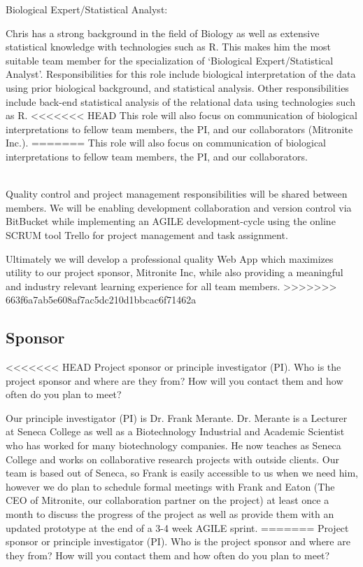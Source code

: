 \documentclass[10pt,twocolumn,letterpaper]{article}
\begin{document}
                Biological Expert/Statistical Analyst:
		
		Chris has a strong background in the field of Biology as well as extensive statistical knowledge with technologies such as R.
		This makes him the most suitable team member for the specialization of `Biological Expert/Statistical Analyst'.
		Responsibilities for this role include biological interpretation of the data using prior biological background, and statistical analysis.
		Other responsibilities include back-end statistical analysis of the relational data using technologies such as R.
<<<<<<< HEAD
		This role will also focus on communication of biological interpretations to fellow team members, the PI, and our collaborators (Mitronite Inc.).	
=======
		This role will also focus on communication of biological interpretations to fellow team members, the PI, and our collaborators.
		
		\\

            	Quality control and project management responsibilities will be shared between members.
		We will be enabling development collaboration and version control via BitBucket while implementing an
		AGILE development-cycle using the online SCRUM tool Trello for project management and task assignment.

            	Ultimately we will develop a professional quality Web App which maximizes utility to our project sponsor,
		Mitronite Inc, while also providing a meaningful and industry relevant learning experience for all team members.
>>>>>>> 663f6a7ab5e608af7ac5dc210d1bbcac6f71462a

        \subsection{Sponsor}

<<<<<<< HEAD
        Project sponsor or principle investigator (PI).
	Who is the project sponsor and where are they from? 
	How will you contact them and how often do you plan to meet?

	Our principle investigator (PI) is Dr. Frank Merante. 
	Dr. Merante is a Lecturer at Seneca College as well as a Biotechnology Industrial and Academic Scientist who has worked for many biotechnology companies.
	He now teaches as Seneca College and works on collaborative research projects with outside clients. 
	Our team is based out of Seneca, so Frank is easily accessible to us when we need him, however we do plan to schedule formal meetings with Frank and Eaton (The CEO of
	Mitronite, our collaboration partner on the project) at least once a month to discuss the progress of the project as well as provide them with an updated prototype at the
	end of a 3-4 week AGILE sprint.
=======
            	Project sponsor or principle investigator (PI).
		Who is the project sponsor and where are they from?
		How will you contact them and how often do you plan to meet?
\end{document}

